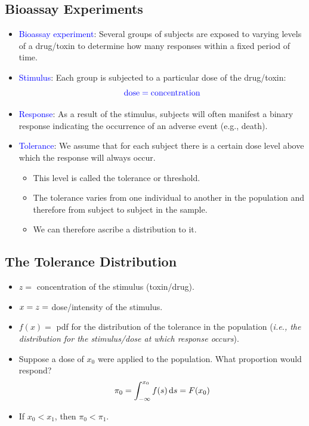 \documentclass[oneside]{book}\usepackage[]{graphicx}\usepackage[svgnames]{xcolor}
\let\log\relax%
\begin{document}
\subsection*{Bioassay Experiments}
\begin{itemize}
      \item \textcolor{Blue}{Bioassay experiment}: Several groups of subjects are exposed to varying levels
            of a drug/toxin to determine how many responses within a fixed period of time.
      \item \textcolor{Blue}{Stimulus}: Each group is subjected to a particular dose of the drug/toxin:
            \[ \textcolor{Blue}{\text{dose}=\log{\text{concentration}}} \]
      \item \textcolor{Blue}{Response}: As a result of the stimulus, subjects will often manifest a binary
            response indicating the occurrence of an adverse event (e.g., death).
      \item \textcolor{Blue}{Tolerance}: We assume that for each subject there is a certain dose level above
            which the response will always occur.
            \begin{itemize}
                  \item This level is called the tolerance or threshold.
                  \item The tolerance varies from one individual to another in the population and therefore
                        from subject to subject in the sample.
                  \item We can therefore ascribe a distribution to it.
            \end{itemize}
\end{itemize}
\subsection*{The Tolerance Distribution}
\begin{itemize}
      \item $ z =$ concentration of the stimulus (toxin/drug).
      \item $ x=\log{z} =$ dose/intensity of the stimulus.
      \item $ f(x)= $ pdf for the distribution of the tolerance in the population (\emph{i.e., the
                  distribution for the stimulus/dose at which response occurs}).
      \item Suppose a dose of $ x_0 $ were applied to the population. What proportion would
            respond?
            \[ \pi_0=\int_{-\infty}^{x_0}f(s)\odif{s}=F(x_0) \]
      \item If $ x_0<x_1 $, then $ \pi_0<\pi_1 $.
\end{itemize}
\end{document}
